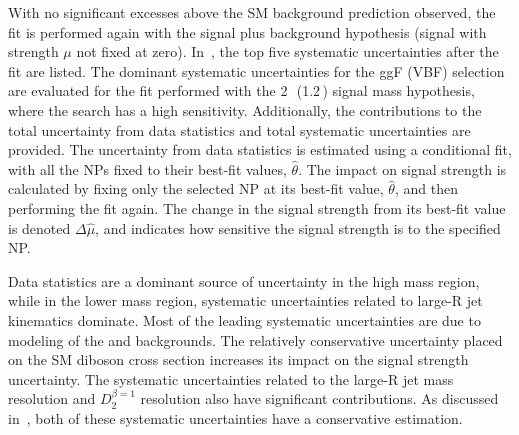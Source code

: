 With no significant excesses above the SM background prediction observed, the fit is performed again with the signal plus background hypothesis (signal with strength $\mu$ not fixed at zero). In~\Tab{\ref{tab:NPranks}}, the top five systematic uncertainties after the fit are listed. The dominant systematic uncertainties for the ggF (VBF) selection are evaluated for the fit performed with the 2\,\TeV\, (1.2\,\TeV) signal mass hypothesis, where the search has a high sensitivity. Additionally, the contributions to the total uncertainty from data statistics and total systematic uncertainties are provided. The uncertainty from data statistics is estimated using a conditional fit, with all the NPs fixed to their best-fit values, $\hat{\theta}$.
The impact on signal strength is calculated by fixing only the selected NP at its best-fit value, $\hat{\theta}$, and then performing the fit again.
The change in the signal strength from its best-fit value is denoted $\Delta\hat{\mu}$, and indicates how sensitive the signal strength is to the specified NP.

Data statistics are a dominant source of uncertainty in the high mass region, while in the lower mass region, systematic uncertainties related to large-R jet kinematics dominate.  Most of the leading systematic uncertainties are due to modeling of the \Wjets and \ttbar backgrounds.  The relatively conservative uncertainty placed on the SM diboson cross section increases its impact on the signal strength uncertainty.   
The systematic uncertainties related to the large-R jet mass resolution and $D_2^{\beta=1}$ resolution also have significant contributions. As discussed in~\Sect{\ref{ch:syst:largerjets}}, both of these systematic uncertainties have a conservative estimation. 

